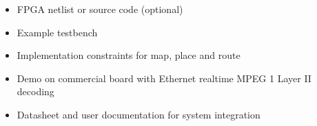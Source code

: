 \begin{itemize}
\item FPGA netlist or source code (optional)
\item Example testbench
\item Implementation constraints for map, place and route
\item Demo on commercial board with Ethernet realtime MPEG 1 Layer II decoding
\item Datasheet and user documentation for system integration
\end{itemize}
